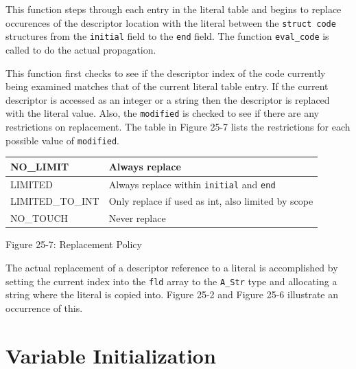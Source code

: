 This function steps through each entry in the literal table and begins
to replace occurences of the descriptor location with the literal
between the \texttt{struct code} structures from the \texttt{initial}
field to the \texttt{end} field.  The function \texttt{eval\_code} is
called to do the actual propagation.


This function first checks to see if the descriptor index of the code
currently being examined matches that of the current literal table
entry. If the current descriptor is accessed as an integer or a string
then the descriptor is replaced with the literal value. Also, the
\texttt{modified} is checked to see if there are any restrictions on
replacement. The table in Figure 25-7 lists the restrictions for
each possible value of \texttt{modified}.

\begin{center}
\tabletail{}
\tablelasttail{}
\begin{xtabular}{|m{1.4670599in}|m{3.2670598in}|}
\hline
{\ttfamily NO\_LIMIT} &
 Always replace\\\hline
{\ttfamily LIMITED} &
 Always replace within \texttt{initial} and \texttt{end}\\\hline
{\ttfamily LIMITED\_TO\_INT} &
 Only replace if used as int, also limited by scope\\\hline
{\ttfamily NO\_TOUCH} &
 Never replace\\\hline
\end{xtabular}
\end{center}
{\centering{}
Figure 25-7: Replacement Policy
\par}


The actual replacement of a descriptor reference to a literal is
accomplished by setting the current index into the \texttt{fld} array
to the \texttt{A\_Str} type and allocating a string where the literal
is copied into. Figure 25-2 and Figure 25-6 illustrate an occurrence
of this.

\section{Variable Initialization}


